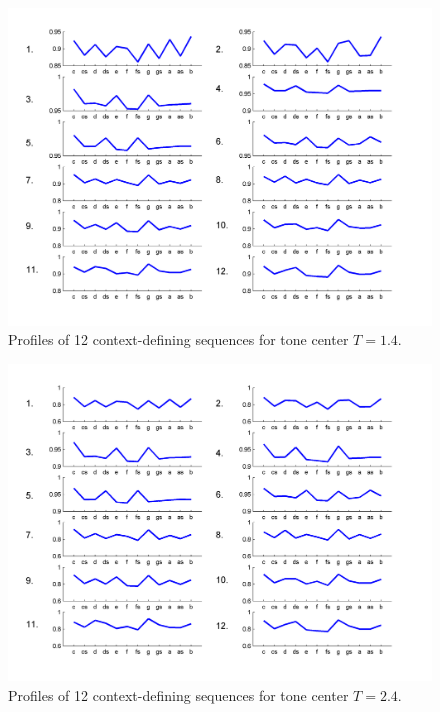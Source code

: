 \begin{figure}[p]
    \centering
    \includegraphics[width=\IPEMDefaultFigureWidth]{Graphics/TonalityDemoKK1Fig7}
    \caption{Profiles of 12 context-defining sequences for tone center $T=1.4.$}
    \label{Fig:TonalityDemoKK1Fig7}
\end{figure}

\begin{figure}[p]
    \centering
    \includegraphics[width=\IPEMDefaultFigureWidth]{Graphics/TonalityDemoKK1Fig12}
    \caption{Profiles of 12 context-defining sequences for tone center $T=2.4.$}
    \label{Fig:TonalityDemoKK1Fig12}
\end{figure}

